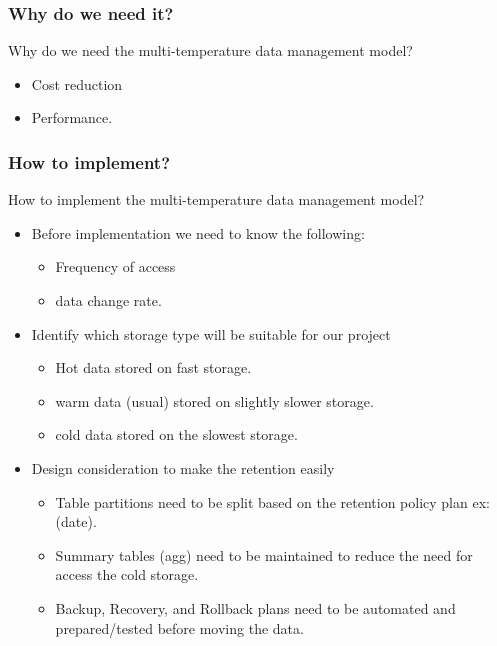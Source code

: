 
\begin{frame}
\frametitle{Why do we need it?}

\begin{wideitemize}
	\item Why do we need the multi-temperature data management model?
	\begin{itemize}[<+->]
		\item Cost reduction \blue{\faDollar \faDollar \faDollar \faDollar}
		\item Performance.
	\end{itemize}
\end{wideitemize}
\end{frame}

\begin{frame}
\frametitle{How to implement?}

\begin{wideitemize}
	\item How to implement the multi-temperature data management model?
	\begin{itemize}[<+->]
		\item Before implementation we need to know the following:
			\begin{itemize}[<+->]
				\item Frequency of access
				\item data change rate.
			\end{itemize}
		\item Identify which storage type will be suitable for our project
			\begin{itemize}[<+->]
				\item Hot data stored on fast storage.
				\item warm data (usual) stored on slightly slower storage.
				\item cold data stored on the slowest storage.
			\end{itemize}
		\item Design consideration to make the retention easily
		\begin{itemize}[<+->]
			\item Table partitions need to be split based on the retention policy plan ex: (date). 
			\item Summary tables (agg) need to be maintained to reduce the need for access the cold storage.
			\item Backup, Recovery, and Rollback plans need to be automated and prepared/tested before moving the data.
		\end{itemize}
	\end{itemize}
\end{wideitemize}
\end{frame}

